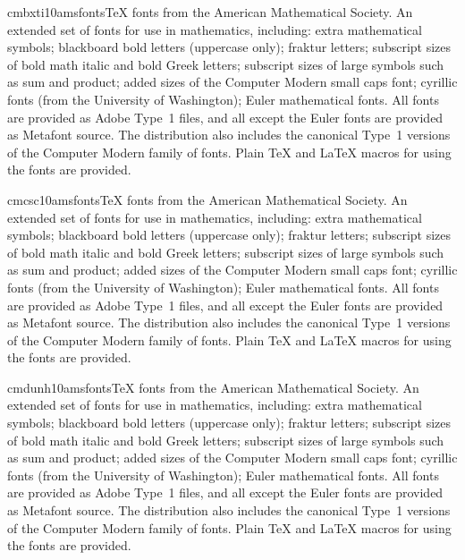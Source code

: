 \documentclass{ddltxtyp}
\begin{document}
\begin{package}{cmbxti10}{amsfonts}{{\TeX} fonts from the American Mathematical Society.}
An extended set of fonts for use in mathematics, including:
extra mathematical symbols; blackboard bold letters (uppercase
only); fraktur letters; subscript sizes of bold math italic and
bold Greek letters; subscript sizes of large symbols such as
sum and product; added sizes of the Computer Modern small caps
font; cyrillic fonts (from the University of Washington); Euler
mathematical fonts. All fonts are provided as Adobe Type~1
files, and all except the Euler fonts are provided as Metafont
source. The distribution also includes the canonical Type~1
versions of the Computer Modern family of fonts. Plain {\TeX} and
{\LaTeX} macros for using the fonts are provided.
\end{package}
\begin{package}{cmcsc10}{amsfonts}{{\TeX} fonts from the American Mathematical Society.}
An extended set of fonts for use in mathematics, including:
extra mathematical symbols; blackboard bold letters (uppercase
only); fraktur letters; subscript sizes of bold math italic and
bold Greek letters; subscript sizes of large symbols such as
sum and product; added sizes of the Computer Modern small caps
font; cyrillic fonts (from the University of Washington); Euler
mathematical fonts. All fonts are provided as Adobe Type~1
files, and all except the Euler fonts are provided as Metafont
source. The distribution also includes the canonical Type~1
versions of the Computer Modern family of fonts. Plain {\TeX} and
{\LaTeX} macros for using the fonts are provided.
\end{package}
\begin{package}{cmdunh10}{amsfonts}{{\TeX} fonts from the American Mathematical Society.}
An extended set of fonts for use in mathematics, including:
extra mathematical symbols; blackboard bold letters (uppercase
only); fraktur letters; subscript sizes of bold math italic and
bold Greek letters; subscript sizes of large symbols such as
sum and product; added sizes of the Computer Modern small caps
font; cyrillic fonts (from the University of Washington); Euler
mathematical fonts. All fonts are provided as Adobe Type~1
files, and all except the Euler fonts are provided as Metafont
source. The distribution also includes the canonical Type~1
versions of the Computer Modern family of fonts. Plain {\TeX} and
{\LaTeX} macros for using the fonts are provided.
\end{package}
\end{document}
